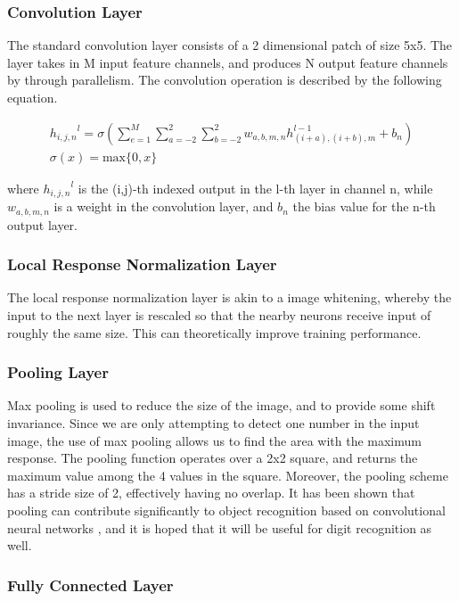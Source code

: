 \documentclass{article} %
\begin{document}
\subsubsection{Convolution Layer}

The standard convolution layer consists of a 2 dimensional patch of size 5x5. The layer takes in M input feature channels, and produces N output feature channels by through parallelism. The convolution operation is described by the following equation. 

\begin{gather}
{h_{i,j,n}}^l = \sigma(\sum_{e=1}^{M}{\sum_{a=-2}^{2}{\sum_{b=-2}^{2} w_{a,b,m,n}h_{(i+a),(i+b),m}^{l-1}} + b_n}) \\
\sigma(x) = \text{max}\{0, x\}
\end{gather}

where ${h_{i,j,n}}^l$ is the (i,j)-th indexed output in the l-th layer in channel n, while $w_{a,b,m,n}$ is a weight in the convolution layer, and $b_n$ the bias value for the n-th output layer. 

\subsubsection{Local Response Normalization Layer}

The local response normalization layer is akin to a image whitening, whereby the input to the next layer is rescaled so that the nearby neurons receive input of roughly the same size. This can theoretically improve training performance. 

\subsubsection{Pooling Layer} 

Max pooling is used to reduce the size of the image, and to provide some shift invariance. Since we are only attempting to detect one number in the input image, the use of max pooling allows us to find the area with the maximum response. The pooling function operates over a 2x2 square, and returns the maximum value among the 4 values in the square. Moreover, the pooling scheme has a stride size of 2, effectively having no overlap. It has been shown that pooling can contribute significantly to object recognition based on convolutional neural networks \cite{pooling}, and it is hoped that it will be useful for digit recognition as well. 

\subsubsection{Fully Connected Layer}
\end{document}
